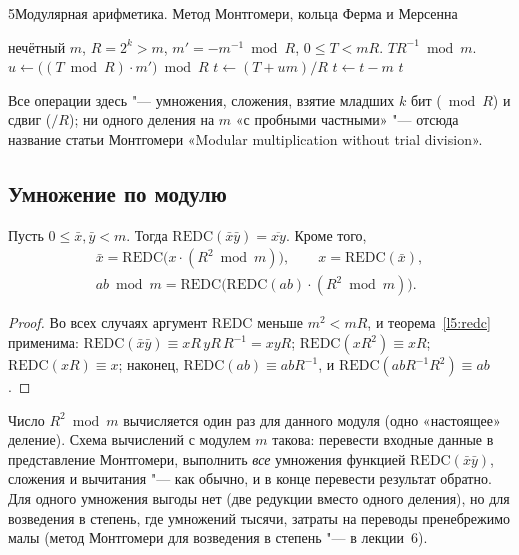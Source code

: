 \begin{lecture}{5}{Модулярная арифметика. Метод Монтгомери, кольца Ферма и Мерсенна}
\begin{algorithm}
\begin{algorithmic}[1]
\Require нечётный $m$, $R = 2^k > m$, $m' = -m^{-1} \bmod R$, $0 \le T < mR$.
\Ensure $TR^{-1} \bmod m$.
\State $u \gets \bigl((T \bmod R) \cdot m'\bigr) \bmod R$ 
\State $t \gets (T + um) / R$ 
 \State $t \gets t - m$ \EndIf
\State \Return $t$
\end{algorithmic}
\end{algorithm}

Все операции здесь "--- умножения, сложения, взятие младших $k$ бит ($\bmod R$) и сдвиг
($/R$); ни одного деления на $m$ «с пробными частными» "--- отсюда название статьи
Монтгомери «Modular multiplication without trial division».


\subsection{Умножение по модулю}

\begin{corollary}\label{l5:montmul}
Пусть $0 \le \bar x, \bar y < m$. Тогда $\mathrm{REDC}(\bar x \bar y) = \overline{xy}$.
Кроме того,
\begin{gather*}
  \bar x = \mathrm{REDC}\bigl(x \cdot (R^2 \bmod m)\bigr), \qquad
  x = \mathrm{REDC}(\bar x),\\
  ab \bmod m = \mathrm{REDC}\bigl(\mathrm{REDC}(ab) \cdot (R^2 \bmod m)\bigr).
\end{gather*}
\end{corollary}

\begin{proof}
Во всех случаях аргумент REDC меньше $m^2 < mR$, и теорема~\ref{l5:redc} применима:
$\mathrm{REDC}(\bar x \bar y) \equiv xR\, yR\, R^{-1} = xyR$;
$\mathrm{REDC}(x R^2) \equiv xR$; $\mathrm{REDC}(xR) \equiv x$; наконец,
$\mathrm{REDC}(ab) \equiv abR^{-1}$, и $\mathrm{REDC}(abR^{-1} R^2) \equiv ab$.
\end{proof}

Число $R^2 \bmod m$ вычисляется один раз для данного модуля (одно «настоящее» деление).
Схема вычислений с модулем $m$ такова: перевести входные данные в представление Монтгомери,
выполнить \emph{все} умножения функцией $\mathrm{REDC}(\bar x \bar y)$, сложения и вычитания "---
как обычно, и в конце перевести результат обратно. Для одного умножения выгоды нет (две
редукции вместо одного деления), но для возведения в степень, где умножений тысячи, затраты
на переводы пренебрежимо малы (метод Монтгомери для возведения в степень "--- в лекции~6).


\end{lecture}
